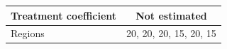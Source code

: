 \begingroup
\centering
\begin{tabular}{lc}
\toprule
Treatment coefficient & Not estimated\\
\midrule
Regions & 20, 20, 20, 15, 20, 15\\
\bottomrule
\end{tabular}
\par\endgroup
